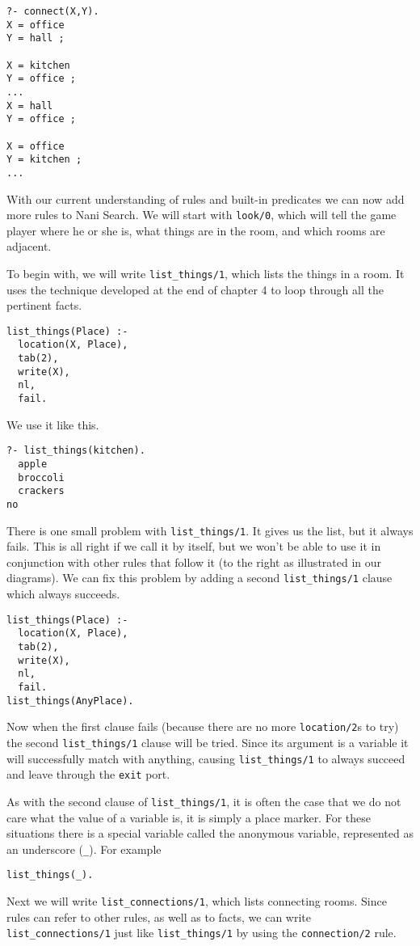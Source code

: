 \begin{verbatim}
?- connect(X,Y).
X = office
Y = hall ;

X = kitchen
Y = office ;
...
X = hall
Y = office ;

X = office
Y = kitchen ;
...
\end{verbatim}
With our current understanding of rules and built-in predicates we can now add
more rules to Nani Search. We will start with \verb'look/0', which will tell the
game player where he or she is, what things are in the room, and which rooms are
adjacent.

To begin with, we will write \verb'list_things/1', which lists the things in a
room. It uses the technique developed at the end of chapter 4 to loop through
all the pertinent facts.

\begin{verbatim}
list_things(Place) :-  
  location(X, Place),
  tab(2),
  write(X),
  nl,
  fail.
\end{verbatim}
We use it like this.

\begin{verbatim}
?- list_things(kitchen).
  apple
  broccoli
  crackers
no
\end{verbatim}
There is one small problem with \verb'list_things/1'. It gives us the list, but
it always fails. This is all right if we call it by itself, but we won't be able to
use it in conjunction with other rules that follow it (to the right as
illustrated in our diagrams). We can fix this problem by adding a second
\verb'list_things/1' clause which always succeeds.

\begin{verbatim}
list_things(Place) :-
  location(X, Place),
  tab(2),
  write(X),
  nl,
  fail.
list_things(AnyPlace).
\end{verbatim}
Now when the first clause fails (because there are no more \verb'location/2's to
try) the second \verb'list_things/1' clause will be tried. Since its argument is
a variable it will successfully match with anything, causing
\verb'list_things/1' to always succeed and leave through the \verb'exit' port.

As with the second clause of \verb'list_things/1', it is often the case that we
do not care what the value of a variable is, it is simply a place marker. For
these situations there is a special variable called the anonymous variable,
represented as an underscore (\verb'_'). For example

\begin{verbatim}
list_things(_).
\end{verbatim}
Next we will write \verb'list_connections/1', which lists connecting rooms.
Since rules can refer to other rules, as well as to facts, we can write
\verb'list_connections/1' just like \verb'list_things/1' by using the
\verb'connection/2' rule.

